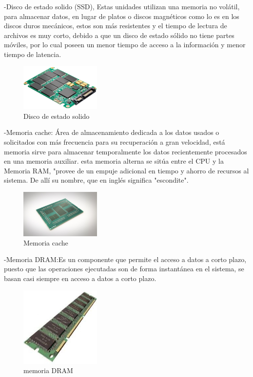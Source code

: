 \documentclass{article}
\begin{document}
-Disco de estado solido (SSD), Estas unidades utilizan una memoria no volátil, para almacenar datos, en lugar de platos o discos magnéticos como lo es en los discos duros mecánicos, estos son más resistentes y el tiempo de lectura de archivos es muy corto, debido a que un disco de estado sólido no tiene partes móviles, por lo cual poseen un menor tiempo de acceso a la información y menor tiempo de latencia.
\newline

\begin{figure}[h]
\includegraphics[width=4cm]{ssd.jpg}
\centering
\caption{Disco de estado solido}
\end{figure} 

-Memoria cache: Área de almacenamiento dedicada a los datos usados o solicitados con más frecuencia para su recuperación a gran velocidad, está memoria sirve para almacenar temporalmente los datos recientemente procesados en una memoria auxiliar. esta memoria alterna se sitúa entre el CPU y la Memoria RAM, \cite{cache} "provee de un empuje adicional en tiempo y ahorro de recursos al sistema. De allí su nombre, que en inglés significa "escondite".
\newline

\begin{figure}[h]
\includegraphics[width=4cm]{Cache.jpg}
\centering
\caption{Memoria cache}
\end{figure}

-Memoria DRAM:Es un componente que permite el acceso a datos a corto plazo, puesto que las operaciones ejecutadas son de forma instantánea en el sistema, se basan casi siempre en acceso a datos a corto plazo.  \newline
\begin{figure}[h]
\includegraphics[width=4cm]{Dinamica.jpeg}
\centering
\caption{memoria DRAM}
\end{figure} 
\end{document}
